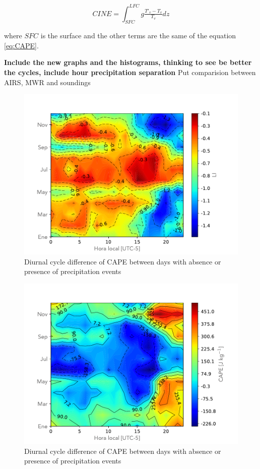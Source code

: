 \documentclass{ametsoc}
\begin{document}
\begin{equation}
CINE = \int_{SFC}^{LFC}g\tfrac{T'_v-T_v}{T_v}dz
\label{eq:CINE}
\end{equation}

where $SFC$ is the surface and the other terms are the same of the equation \ref{eq:CAPE}.


\textbf{Include the new graphs and the histograms, thinking to see be better the cycles, include hour precipitation separation}
Put comparision between AIRS, MWR and soundings
\begin{figure}[h!]
\centering
\includegraphics[width=1.0\linewidth]{Figuras/LI_Matrix_resta.pdf}
\caption{Diurnal cycle difference of CAPE between days with absence or presence of precipitation events }
\label{fig:LIdifference}
\end{figure}


\begin{figure}[h!]
\centering
\includegraphics[width=1.0\linewidth]{Figuras/CAPE_Matrix_resta.pdf}
\caption{Diurnal cycle difference of CAPE between days with absence or presence of precipitation events }
\label{fig:CAPEdifference}
\end{figure}
\end{document}

